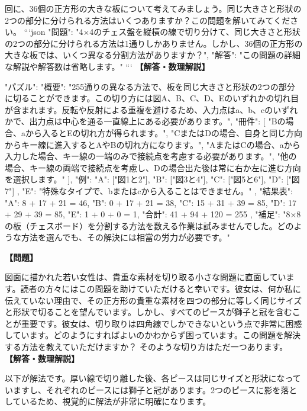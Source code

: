 \documentclass[10pt,a4paper,oneside,openany]{ltjsbook}
\begin{document}
\begin{tcolorbox}[colback=softblue,colframe=primaryblue,title=\textbf{第 288 問：CHEQUERED BOARD DIVISIONS.},arc=2mm,boxrule=1pt,breakable]
回に、36個の正方形の大きな板について考えてみましょう。同じ大きさと形狀の2つの部分に分けられる方法はいくつありますか？この問題を解いてみてください。
```json
{
  "問題": "4×4のチェス盤を縦橫の線で切り分けて、同じ大きさと形狀の2つの部分に分けられる方法は1通りしかありません。しかし、36個の正方形の大きな板では、いくつ異なる分割方法がありますか？",
  "解答": "この問題の詳細な解説や解答数は省略します。"
}
```
\tcblower
\textbf{【解答・数理解説】}\par\vspace{0.3em}
{
    "パズル": {
        "概要": "255通りの異なる方法で、板を同じ大きさと形狀の2つの部分に切ることができます。この切り方には図A、B、C、D、Eのいずれかの切れ目が含まれます。反転や反射による重複を避けるため、入力点はa、b、cのいずれかで、出力点は中心を通る一直線上にある必要があります。",
        "冊件": [
            "Bの場合、aから入るとEの切れ方が得られます。",
            "CまたはDの場合、自身と同じ方向からキー線に進入するとAやBの切れ方になります。",
            "AまたはCの場合、aから入力した場合、キー線の一端のみで接続点を考慮する必要があります。",
            "他の場合、キー線の両端で接続点を考慮し、Dの場合出た後は常に右か左に進む方向を選択します。"
        ],
        "例": {
            "A": ["図1と2"],
            "B": ["図3と4"],
            "C": ["図5と6"],
            "D": ["図7"]
        },
        "E": "特殊なタイプで、bまたはcから入ることはできません。"
    },
    "結果表": {
        "A": 8 + 17 + 21 = 46,
        "B": 0 + 17 + 21 = 38,
        "C": 15 + 31 + 39 = 85,
        "D": 17 + 29 + 39 = 85,
        "E": 1 + 0 + 0 = 1,
        "合計": 41 + 94 + 120 = 255
    },
    "補足": "8×8の板（チェスボード）を分割する方法を数える作業は試みませんでした。どのような方法を選んでも、その解決には相當の労力が必要です。"
}
\end{tcolorbox}

\begin{tcolorbox}[colback=softblue,colframe=primaryblue,title=\textbf{第 289 問：獅子と冠 （原題: LIONS AND CROWNS.）},arc=2mm,boxrule=1pt,breakable]
\textbf{【問題】}\par\vspace{0.3em}
図面に描かれた若い女性は、貴重な素材を切り取る小さな問題に直面しています。読者の方々にはこの問題を助けていただけると幸いです。彼女は、何か私に伝えていない理由で、その正方形の貴重な素材を四つの部分に等しく同じサイズと形狀で切ることを望んでいます。しかし、すべてのピースが獅子と冠を含むことが重要です。彼女は、切り取りは四角線でしかできないという点で非常に困惑しています。どのようにすればよいのかわからず困っています。この問題を解決する方法を教えていただけますか？ そのような切り方はただ一つあります。
\tcblower
\textbf{【解答・数理解説】}\par\vspace{0.3em}
以下が解法です。厚い線で切り離した後、各ピースは同じサイズと形狀になっていますし、それぞれのピースには獅子と冠があります。2つのピースに影を落としているため、視覚的に解法が非常に明確になります。
\end{tcolorbox}
\end{document}
